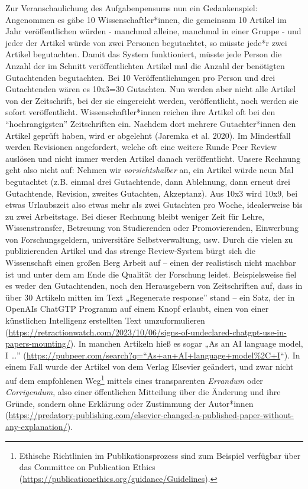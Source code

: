 \documentclass[
  letterpaper,
  DIV=11,
  numbers=noendperiod]{scrreprt}
\begin{document}
Zur Veranschaulichung des Aufgabenpensums nun ein Gedankenspiel:
Angenommen es gäbe 10 Wissenschaftler*innen, die gemeinsam 10 Artikel im
Jahr veröffentlichen würden - manchmal alleine, manchmal in einer Gruppe
- und jeder der Artikel würde von zwei Personen begutachtet, so müsste
jede*r zwei Artikel begutachten. Damit das System funktioniert, müsste
jede Person die Anzahl der im Schnitt veröffentlichten Artikel mal die
Anzahl der benötigten Gutachtenden begutachten. Bei 10
Veröffentlichungen pro Person und drei Gutachtenden wären es 10x3=30
Gutachten. Nun werden aber nicht alle Artikel von der Zeitschrift, bei
der sie eingereicht werden, veröffentlicht, noch werden sie sofort
veröffentlicht. Wissenschaftler*innen reichen ihre Artikel oft bei den
``hochrangigsten'' Zeitschriften ein. Nachdem dort mehrere
Gutachter*innen den Artikel geprüft haben, wird er abgelehnt (Jaremka et
al. 2020). Im Mindestfall werden Revisionen angefordert, welche oft eine
weitere Runde Peer Review auslösen und nicht immer werden Artikel danach
veröffentlicht. Unsere Rechnung geht also nicht auf: Nehmen wir
\emph{vorsichtshalber} an, ein Artikel würde neun Mal begutachtet (z.B.
einmal drei Gutachtende, dann Ablehnung, dann erneut drei Gutachtende,
Revision, zweites Gutachten, Akzeptanz). Aus 10x3 wird 10x9, bei etwas
Urlaubszeit also etwas mehr als zwei Gutachten pro Woche, idealerweise
bis zu zwei Arbeitstage. Bei dieser Rechnung bleibt weniger Zeit für
Lehre, Wissenstransfer, Betreuung von Studierenden oder Promovierenden,
Einwerbung von Forschungsgeldern, universitäre Selbstverwaltung, usw.
Durch die vielen zu publizierenden Artikel und das strenge Review-System
bürgt sich die Wissenschaft einen großen Berg Arbeit auf -- einen der
realistisch nicht machbar ist und unter dem am Ende die Qualität der
Forschung leidet. Beispielsweise fiel es weder den Gutachtenden, noch
den Herausgebern von Zeitschriften auf, dass in über 30 Artikeln mitten
im Text „Regenerate response'' stand -- ein Satz, der in OpenAIs ChatGTP
Programm auf einem Knopf erlaubt, einen von einer künstlichen
Intelligenz erstellten Text umzuformulieren
(\url{https://retractionwatch.com/2023/10/06/signs-of-undeclared-chatgpt-use-in-papers-mounting/}).
In manchen Artikeln hieß es sogar „As an AI language model, I \ldots''
(\href{https://pubpeer.com/search?q=\%22As+an+AI+language+model\%2C+I}{https://pubpeer.com/search?q=``As+an+AI+language+model\%2C+I}``).
In einem Fall wurde der Artikel von dem Verlag Elsevier geändert, und
zwar nicht auf dem empfohlenen Weg\footnote{Ethische Richtlinien im
  Publikationsprozess sind zum Beispiel verfügbar über das Committee on
  Publication Ethics
  (\url{https://publicationethics.org/guidance/Guidelines}).} mittels
eines transparenten \emph{Errandum} oder \emph{Corrigendum}, also einer
öffentlichen Mitteilung über die Änderung und ihre Gründe, sondern ohne
Erklärung oder Zustimmung der Autor*innen
(\url{https://predatory-publishing.com/elsevier-changed-a-published-paper-without-any-explanation/}).
\end{document}
